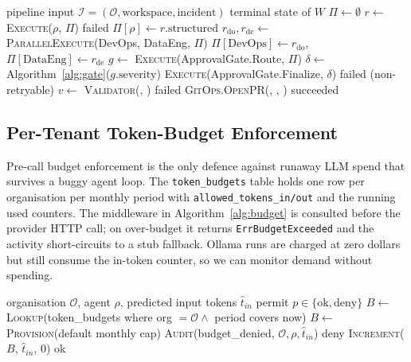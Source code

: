 \documentclass[manuscript,nonacm=true,screen=false,review=false]{acmart}
\begin{document}
\begin{algorithm}
\caption{RecoveryPipeline workflow body}\label{alg:dag}
\begin{algorithmic}[1]
\Require pipeline input $\mathcal{I}=(\mathcal{O}, \text{workspace}, \text{incident})$
\Ensure terminal state of $W$
\State $\Pi \gets \emptyset$ 
  \State $r \gets$ \textsc{Execute}($\rho$, $\Pi$)
   \State \Return failed \EndIf
  \State $\Pi[\rho] \gets r.\text{structured}$
\EndFor
\State $r_{\text{do}}, r_{\text{de}} \gets$ \textsc{ParallelExecute}(DevOps, DataEng, $\Pi$)
\State $\Pi[\text{DevOps}] \gets r_{\text{do}}$, $\Pi[\text{DataEng}] \gets r_{\text{de}}$
\State $g \gets$ \textsc{Execute}(ApprovalGate.Route, $\Pi$) 
\State $\delta \gets$ Algorithm~\ref{alg:gate}($g.\text{severity}$)
\State \textsc{Execute}(ApprovalGate.Finalize, $\delta$)
  \State \Return failed (non-retryable)
\EndIf
\State $v \gets$ \textsc{Validator}(, )
 \State \Return failed \EndIf
\State \textsc{GitOps.OpenPR}(, , )
\State \Return succeeded
\end{algorithmic}
\end{algorithm}

\subsection{Per-Tenant Token-Budget Enforcement}

Pre-call budget enforcement is the only defence against runaway LLM spend that survives a buggy agent loop. The \texttt{token\_budgets} table holds one row per organisation per monthly period with \texttt{allowed\_tokens\_in/out} and the running used counters. The middleware in Algorithm~\ref{alg:budget} is consulted before the provider HTTP call; on over-budget it returns \texttt{ErrBudgetExceeded} and the activity short-circuits to a stub fallback. Ollama runs are charged at zero dollars but still consume the in-token counter, so we can monitor demand without spending.

\begin{algorithm}
\caption{Pre-call token budget middleware}\label{alg:budget}
\begin{algorithmic}[1]
\Require organisation $\mathcal{O}$, agent $\rho$, predicted input tokens $\hat{t}_{in}$
\Ensure permit $p \in \{\text{ok}, \text{deny}\}$
\State $B \gets$ \textsc{Lookup}(token\_budgets where org $=\mathcal{O} \wedge$ period covers now)
 \State $B \gets$ \textsc{Provision}(default monthly cap) \EndIf
{}
  \State \textsc{Audit}(budget\_denied, $\mathcal{O}, \rho, \hat{t}_{in}$)
  \State \Return deny
\EndIf
\State \textsc{Increment}($B$, $\hat{t}_{in}$, 0) 
\State \Return ok
\end{algorithmic}
\end{algorithm}
\end{document}
